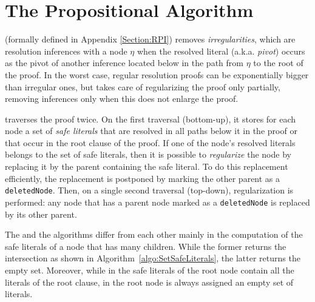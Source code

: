 \section{The Propositional Algorithm}

{\RPI} (formally defined in Appendix \ref{Section:RPI}) removes \emph{irregularities}, which are resolution inferences with a node $\eta$ when the resolved literal (a.k.a. \emph{pivot}) occurs as the pivot of another inference located below in the path from $\eta$ to the root of the proof. In the worst case, regular resolution proofs can be exponentially bigger than irregular ones, but {\RPI} takes care of regularizing the proof only partially, removing inferences only when this does not enlarge the proof.

{\RPI} traverses the proof twice. On the first traversal (bottom-up), it stores for each node a set of \emph{safe literals} that are resolved in all paths below it in the proof or that occur in the root clause of the proof. If one of the node's resolved literals belongs to the set of safe literals, then it is possible to \emph{regularize} the node by replacing it by the parent containing the safe literal. To do this replacement efficiently, the replacement is postponed by marking the other parent as a \texttt{deletedNode}. Then, on a single second traversal (top-down), regularization is performed: any node that has a parent node marked as a \texttt{deletedNode} is replaced by its other parent.

The {\RPI} and the {\RP} algorithms differ from each other mainly in the
computation of the safe literals of a node that has many children. While the former 
returns the intersection as shown in Algorithm~\ref{algo:SetSafeLiterals}, the latter
returns the empty set. 
Moreover, while in {\RPI} the safe literals of the root node contain all the literals of the root clause, in {\RP} the root node is always assigned an empty set of literals. 